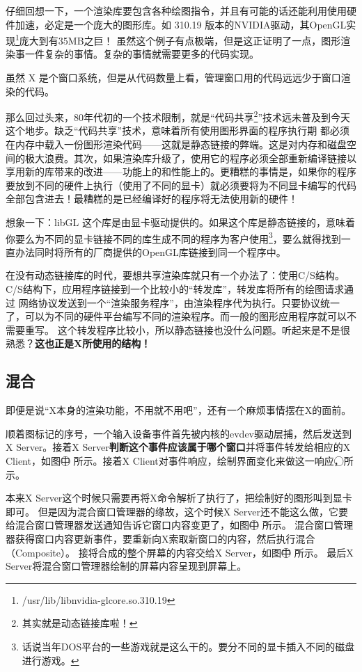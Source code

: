 仔细回想一下，一个渲染库要包含各种绘图指令，并且有可能的话还能利用使用硬件加速，必定是一个庞大的图形库。如 310.19 版本的NVIDIA驱动，其OpenGL实现\footnote{/usr/lib/libnvidia-glcore.so.310.19}庞大到有35MB之巨！ 
虽然这个例子有点极端，但是这正证明了一点，图形渲染事一件复杂的事情。复杂的事情就需要更多的代码实现。

虽然 X 是个窗口系统，但是从代码数量上看，管理窗口用的代码远远少于窗口渲染的代码。

那么回过头来，80年代初的一个技术限制，就是“代码共享\footnote{其实就是动态链接库啦！}”技术远未普及到今天这个地步。缺乏“代码共享”技术，意味着所有使用图形界面的程序执行期
都必须在内存中载入一份图形渲染代码——这就是静态链接的弊端。这是对内存和磁盘空间的极大浪费。其次，如果渲染库升级了，使用它的程序必须全部重新编译链接以享用新的库带来的改进——功能上的和性能上的。更糟糕的事情是，如果你的程序要放到不同的硬件上执行（使用了不同的显卡）就必须要将为不同显卡编写的代码全部包含进去！最糟糕的是已经编译好的程序将无法使用新的硬件！

想象一下：libGL 这个库是由显卡驱动提供的。如果这个库是静态链接的，意味着你要么为不同的显卡链接不同的库生成不同的程序为客户使用\footnote{话说当年DOS平台的一些游戏就是这么干的。要分不同的显卡插入不同的磁盘进行游戏。}，要么就得找到一直办法同时将所有的厂商提供的OpenGL库链接到同一个程序中。


在没有动态链接库的时代，要想共享渲染库就只有一个办法了：使用C/S结构。C/S结构下，应用程序链接到一个比较小的“转发库”，转发库将所有的绘图请求通过
网络协议发送到一个“渲染服务程序”，由渲染程序代为执行。只要协议统一了，可以为不同的硬件平台编写不同的渲染程序。而一般的图形应用程序就可以不需要重写。
这个转发程序比较小，所以静态链接也没什么问题。听起来是不是很熟悉？\textbf{这也正是X所使用的结构！}

\subsection{混合}

即便是说“X本身的渲染功能，不用就不用吧”，还有一个麻烦事情摆在X的面前。


顺着图\thefigure{}标记的序号，一个输入设备事件首先被内核的evdev驱动层捕，然后发送到X Server。接着X Server\textbf{判断这个事件应该属于哪个窗口}并将事件转发给相应的X Client，如图中\textcircled{} 所示。接着X Client对事件响应，绘制界面变化来做这一响应，\textcircled{}所示。

本来X Server这个时候只需要再将X命令解析了执行了，把绘制好的图形叫到显卡即可。
但是因为混合窗口管理器的缘故，这个时候X Server还不能这么做，它要给混合窗口管理器发送通知告诉它窗口内容变更了，如图中\textcircled{} 所示。
混合窗口管理器获得窗口内容更新事件，要重新向X索取新窗口的内容，然后执行混合（Composite）。
接将合成的整个屏幕的内容交给X Server，如图中\textcircled{} 所示。
最后X Server将混合窗口管理器绘制的屏幕内容呈现到屏幕上。

